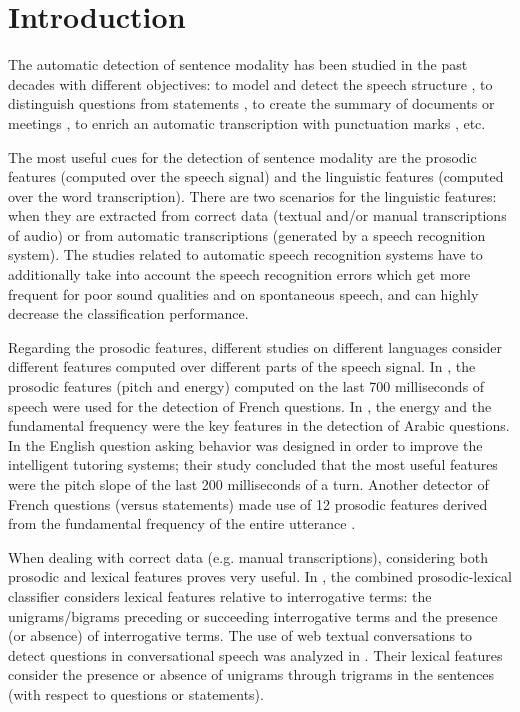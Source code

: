 \documentclass[runningheads,a4paper]{llncs}
\begin{document}

\section{Introduction}

The automatic detection of sentence modality has been studied in the past decades with different objectives: to model and detect the speech structure \cite{Jurafsky:1997}, to distinguish questions from statements  \cite{Kral:2005,Yuan:2005,Quang:2006,Quang:2007,Khan:2010,Margolis:2011}, to create the summary of documents or meetings \cite{Quang:2006}, to enrich an automatic transcription with punctuation marks \cite{Kolar:2012}, etc.

The most useful cues for the detection of sentence modality are the prosodic features (computed over the speech signal) and the linguistic features (computed over the word transcription).
There are two scenarios for the linguistic features: when they are extracted from correct data (textual and/or manual transcriptions of audio) or from automatic transcriptions (generated by a speech recognition system). The studies related to automatic speech recognition systems have to additionally take into account the speech recognition errors which get more frequent for poor sound qualities and on spontaneous speech, and can highly decrease the classification performance.

Regarding the prosodic features, different studies on different languages consider different features computed over different parts of the speech signal.
In \cite{Kral:2005}, the prosodic features (pitch and energy) computed on the last 700 milliseconds of speech were used for the detection of French questions.
In \cite{Khan:2010}, the energy and the fundamental frequency were the key features in the detection of Arabic questions.
In \cite{Liscombe:2006} the English question asking behavior was designed in order to improve the intelligent tutoring systems; their study concluded that the most useful features were the pitch slope of the last 200 milliseconds of a turn.
Another detector of French questions (versus statements) made use of 12 prosodic features derived from the fundamental frequency of the entire utterance \cite{Quang:2006}.

When dealing with correct data (e.g. manual transcriptions), considering both prosodic and lexical features proves very useful.
In \cite{Quang:2007}, the combined prosodic-lexical classifier considers lexical features relative to interrogative terms: the unigrams/bigrams preceding or succeeding interrogative terms and the presence (or absence) of interrogative terms.
The use of web textual conversations to detect questions in conversational speech was analyzed in \cite{Margolis:2011}.
Their lexical features consider the presence or absence of unigrams through trigrams in the sentences (with respect to questions or statements).
\end{document}
